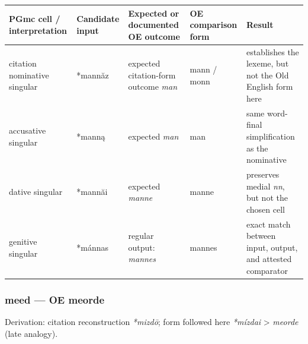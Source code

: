 \documentclass[
  british,
  a4paper,
]{article}
\newcounter{none} %
\begin{document}
{\def\LTcaptype{none} %
\begin{longtable}[]{@{}
  >{\raggedright\arraybackslash}p{}
  >{\raggedright\arraybackslash}p{}
  >{\raggedright\arraybackslash}p{}
  >{\raggedright\arraybackslash}p{}
  >{\raggedright\arraybackslash}p{}@{}}
\toprule\noalign{}
\begin{minipage}[b]{\linewidth}\raggedright
PGmc cell / interpretation
\end{minipage} & \begin{minipage}[b]{\linewidth}\raggedright
Candidate input
\end{minipage} & \begin{minipage}[b]{\linewidth}\raggedright
Expected or documented OE outcome
\end{minipage} & \begin{minipage}[b]{\linewidth}\raggedright
OE comparison form
\end{minipage} & \begin{minipage}[b]{\linewidth}\raggedright
Result
\end{minipage} \\
\midrule\noalign{}
\endhead
\bottomrule\noalign{}
\endlastfoot
citation nominative singular & *mannăz & expected citation-form outcome
\emph{man} & mann / monn & establishes the lexeme, but not the Old
English form here \\
accusative singular & *manną & expected \emph{man} & man & same
word-final simplification as the nominative \\
dative singular & *mannăi & expected \emph{manne} & manne & preserves
medial \emph{nn}, but not the chosen cell \\
genitive singular & *mánnas & regular output: \emph{mannes} & mannes &
exact match between input, output, and attested comparator \\
\end{longtable}
}

\subsubsection{meed --- OE meorde}\label{meed-oe-meorde}

Derivation: citation reconstruction \emph{*mizdō}; form followed here
\emph{*mízdai} \textgreater{} \emph{meorde} (late analogy).
\end{document}
